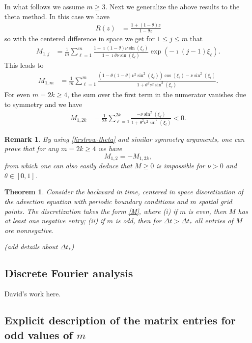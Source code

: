 \documentclass[a4paper]{article}
\newtheorem{theorem}{Theorem}
\newtheorem{remark}{Remark}
\newcommand{\dt}{\Delta t}
\newcommand{\te}{\theta}
\begin{document}
In what follows we assume $m\ge 3$. Next we generalize the above results to the theta method.  In this case we have
\begin{align}
    R(z) & = \frac{1+(1-\theta)z}{1-\theta z}
\end{align}
so with the centered difference in space we get for $1\le j\le m$ that
\begin{align} \label{firstrow-theta}
    M_{1,j} & = \frac{1}{m} \sum_{\ell=1}^m \frac{1+\imath(1-\theta)\nu \sin(\xi_\ell)}{1-\imath\theta\nu \sin(\xi_\ell)}\exp\left(-\imath(j-1)\xi_\ell\right).
\end{align}
This leads to
\begin{align*} 
    M_{1,m} & = \frac{1}{m} \sum_{\ell=1}^m \frac{(1-\theta(1-\theta)\nu^2\sin^2(\xi_\ell))\cos(\xi_\ell)- \nu \sin^2 (\xi_\ell)}{1+\theta^2\nu^2 \sin^2 (\xi_\ell)}.
\end{align*}
For even $m=2k\ge 4$, the sum over the first term in the numerator vanishes due to symmetry and we have
\begin{align*}
    M_{1,2k} & =  \frac{1}{2k} \sum_{\ell=1}^{2k} \frac{- \nu \sin^2 (\xi_\ell)}{1+\theta^2\nu^2 \sin^2 (\xi_\ell)} < 0.
\end{align*}
\begin{remark}
By using \eqref{firstrow-theta} and similar symmetry arguments, one can prove that for any $m=2k\ge 4$ we have
\[
M_{1,2}=-M_{1,2k},
\]
from which one can also easily deduce that $M\ge 0$ is impossible for $\nu>0$ and $\te\in[0,1]$.
\end{remark}

\begin{theorem}
Consider the backward in time, centered in space discretization of the
advection equation with periodic boundary conditions and $m$ spatial grid
points.  The discretization takes the form \eqref{M},
where (i) if $m$ is even, then $M$ has at least one negative entry;
(ii) if $m$ is odd, then for $\dt>\dt_*$ all entries of $M$ are nonnegative.

(add details about $\dt_*$)
\end{theorem}

\subsection{Discrete Fourier analysis}
David's work here.

\subsection{Explicit description of the matrix entries for odd values of $m$}\label{explsect}
\end{document}
